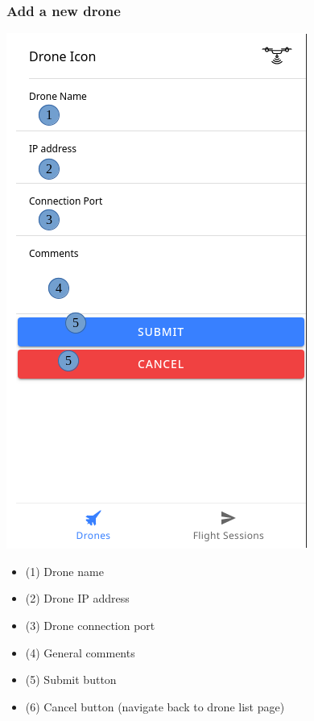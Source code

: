 \subsubsection{Add a new drone}
\begin{minipage}[c]{0.5\linewidth}
	\centering
	\includegraphics[scale=0.4]{./assets/images/add-new.png}
	\label{fig: mainPageAddDrone}
\end{minipage}
\begin{minipage}[c]{0.5\linewidth}
	\begin{itemize}
		\item (1) Drone name
		\item (2) Drone IP address
		\item (3) Drone connection port
		\item (4) General comments
		\item (5) Submit button
		\item (6) Cancel button (navigate back to drone list page)
	\end{itemize}
\end{minipage}

